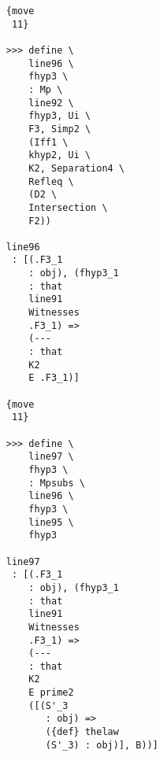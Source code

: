 \documentclass[12pt]{article}
\begin{document}
\begin{verbatim}
                                    {move 
                                     11}

                                    >>> define \
                                        line96 \
                                        fhyp3 \
                                        : Mp \
                                        line92 \
                                        fhyp3, Ui \
                                        F3, Simp2 \
                                        (Iff1 \
                                        khyp2, Ui \
                                        K2, Separation4 \
                                        Refleq \
                                        (D2 \
                                        Intersection \
                                        F2))

                                    line96 
                                     : [(.F3_1 
                                        : obj), (fhyp3_1 
                                        : that 
                                        line91 
                                        Witnesses 
                                        .F3_1) => 
                                        (--- 
                                        : that 
                                        K2 
                                        E .F3_1)]

                                    {move 
                                     11}

                                    >>> define \
                                        line97 \
                                        fhyp3 \
                                        : Mpsubs \
                                        line96 \
                                        fhyp3 \
                                        line95 \
                                        fhyp3

                                    line97 
                                     : [(.F3_1 
                                        : obj), (fhyp3_1 
                                        : that 
                                        line91 
                                        Witnesses 
                                        .F3_1) => 
                                        (--- 
                                        : that 
                                        K2 
                                        E prime2 
                                        ([(S'_3 
                                           : obj) => 
                                           ({def} thelaw 
                                           (S'_3) : obj)], B))]


\end{verbatim}
\end{document}
